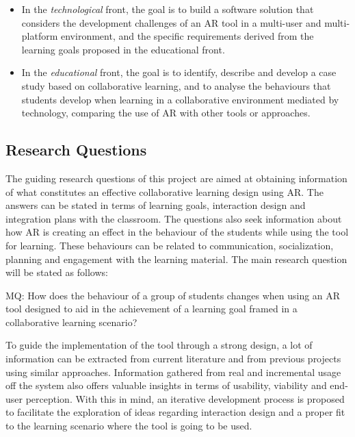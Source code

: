 \begin{itemize}
    \item In the \emph{technological} front, the goal is to build a software solution that considers the development challenges of an \ac{AR} tool in a multi-user
    and multi-platform environment, and the specific requirements derived from the learning goals proposed in the educational front.
    \item In the \emph{educational} front, the goal is to identify, describe and develop a case study based on collaborative learning, and to analyse the
    behaviours that students develop when learning in a collaborative environment mediated by technology, comparing the use of \ac{AR} with other tools or
    approaches.
\end{itemize}

\subsection{Research Questions \label{sec:1-2-1}}

The guiding research questions of this project are aimed at obtaining information of what constitutes an effective collaborative learning design using \ac{AR}.
The answers can be stated in terms of learning goals, interaction design and integration plans with the classroom. The questions also seek information about
how \ac{AR} is creating an effect in the behaviour of the students while using the tool for learning.  These behaviours can be related to communication,
socialization, planning and engagement with the learning material. The main research question will be stated as follows:

\begin{displayquote}
    MQ: How does the behaviour of a group of students changes when using an \ac{AR} tool designed to aid in the achievement of a learning goal framed in a
    collaborative learning scenario?
\end{displayquote}

To guide the implementation of the tool through a strong design, a lot of information can be extracted from current literature and from previous projects
using similar approaches. Information gathered from real and incremental usage off the system also offers valuable insights in terms of usability, viability
and end-user perception. With this in mind, an iterative development process is proposed to facilitate the exploration of ideas regarding interaction design
and a proper fit to the learning scenario where the tool is going to be used.

